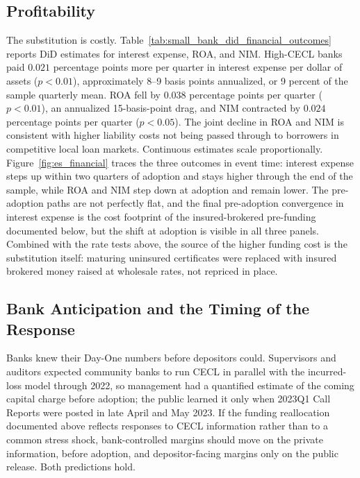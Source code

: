 \subsection{Profitability}
\label{sec:results:financial}

The substitution is costly.
Table~\ref{tab:small_bank_did_financial_outcomes} reports DiD estimates
for interest expense, ROA, and NIM.  High-CECL banks paid $0.021$
percentage points more per quarter in interest expense per dollar of
assets ($p<0.01$), approximately 8--9 basis points annualized, or 9
percent of the sample quarterly mean.  ROA fell by $0.038$ percentage
points per quarter ($p<0.01$), an annualized 15-basis-point drag, and
NIM contracted by $0.024$ percentage points per quarter ($p<0.05$).
The joint decline in ROA and NIM is consistent with higher liability
costs not being passed through to borrowers in competitive local loan
markets.
Continuous estimates scale proportionally.
Figure~\ref{fig:es_financial} traces the three outcomes in event time:
interest expense steps up within two quarters of adoption and stays
higher through the end of the sample, while ROA and NIM step down at
adoption and remain lower.  The pre-adoption paths are not perfectly
flat, and the final pre-adoption convergence in interest expense is
the cost footprint of the insured-brokered pre-funding documented
below, but the shift at adoption is visible in all three panels.
Combined with the rate
tests above, the source of the higher funding cost is the substitution
itself: maturing uninsured certificates were replaced with insured
brokered money raised at wholesale rates, not repriced
in place.

\subsection{Bank Anticipation and the Timing of the Response}
\label{sec:results:anticipation}

Banks knew their Day-One numbers before depositors could.  Supervisors
and auditors expected community banks to run CECL in parallel with the
incurred-loss model through 2022, so management had a quantified
estimate of the coming capital charge before adoption; the public
learned it only when 2023Q1 Call Reports were posted in late April and
May 2023.  If the funding reallocation documented above reflects
responses to CECL information rather than to a common stress shock,
bank-controlled margins should move on the private information, before
adoption, and depositor-facing margins only on the public release.
Both predictions hold.


